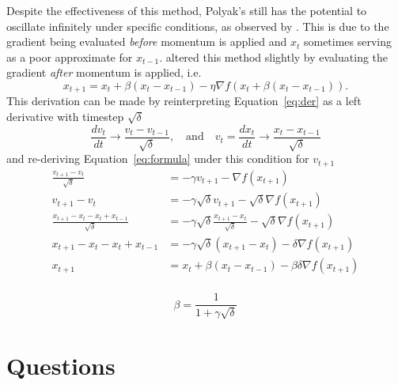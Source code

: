 \documentclass{article}
\newcommand{\dv}[2]{\frac{d #1}{d #2}}
\begin{document}
Despite the effectiveness of this method, Polyak's still has the potential to
oscillate infinitely under specific conditions, as observed by
\citeauthor{lessard2016analysis}. This is due to the gradient being evaluated
\emph{before} momentum is applied and $x_t$ sometimes serving as a poor approximate
for $x_{t - 1}$. \citeauthor{nesterov1983method} altered this method slightly by
evaluating the gradient \emph{after} momentum is applied, i.e.
\begin{equation}
    x_{t + 1} = x_t + \beta (x_t - x_{t - 1}) - \eta \nabla f(x_t + \beta (x_t - x_{t -
    1})) .
\end{equation}
This derivation can be made by reinterpreting Equation~\ref{eq:der} as a left
derivative with timestep $\sqrt\delta$
\begin{equation}
    \label{eq:der}
    \dv{v_t}{t} \rightarrow \frac{v_{t} - v_{t - 1}}{\sqrt{\delta}}, \quad \text{and}
    \quad v_{t} = \dv{x_t}{t} \rightarrow \frac{x_{t} - x_{t - 1}}{\sqrt{\delta}}
\end{equation}
and re-deriving Equation~\ref{eq:formula} under this condition for $v_{t + 1}$
\begin{equation}
    \label{eq:formula}
    \begin{aligned}
        \frac{v_{t + 1} - v_{t}}{\sqrt{\delta}} &= -\gamma v_{t + 1} -\nabla
        f(x_{t + 1}) \\
        v_{t + 1} - v_{t} &= -\gamma \sqrt{\delta}v_{t + 1} -\sqrt{\delta}\nabla
        f(x_{t + 1}) \\
        \frac{x_{t + 1} - x_{t} - x_{t} + x_{t - 1}}{\sqrt{\delta}} &= -\gamma
        \sqrt{\delta}\frac{x_{t + 1} - x_t}{\sqrt{\delta}} -\sqrt{\delta}\nabla
        f(x_{t + 1}) \\
        x_{t + 1} - x_{t} - x_{t} + x_{t - 1} &= -\gamma
        \sqrt{\delta}(x_{t + 1} - x_t) - \delta\nabla
        f(x_{t + 1}) \\
         x_{t + 1}  &= x_t + \beta(x_{t} - x_{t - 1}) - \beta\delta\nabla
        f(x_{t + 1}) \\
    \end{aligned}
\end{equation}

\begin{equation}
    \beta = \frac{1}{1 + \gamma \sqrt{\delta}}
\end{equation}


\section{Questions}%
\label{sec:questions}
\end{document}
